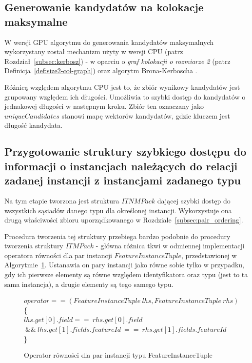 \documentclass[12pt]{article}
\begin{document}
\subsection{Generowanie kandydatów na kolokacje maksymalne}

W wersji GPU algorytmu do generowania kandydatów maksymalnych wykorzystany został mechanizm użyty w wersji CPU (patrz Rozdział~\ref{subsec:kerbosz}) -  w oparciu o \textit{graf kolokacji o rozmiarze 2} (patrz Definicja~\ref{def:size2-col-graph}) oraz algorytm Brona-Kerboscha \cite{kerbosz}.

Różnicą względem algorytmu CPU jest to, że zbiór wynikowy kandydatów jest grupowany względem ich długości. Umożliwia to szybki dostęp do kandydatów o jednakowej długości w następnym kroku. Zbiór ten oznaczany jako $ uniqueCandidates $ stanowi mapę wektorów kandydatów, gdzie kluczem jest długość kandydata.

\subsection{Przygotowanie struktury szybkiego dostępu do informacji o instancjach należących do relacji zadanej instancji z instancjami zadanego typu}

Na tym etapie tworzona jest struktura $ ITNMPack $ dającej szybki dostęp do wszystkich sąsiadów danego typu dla określonej instancji. Wykorzystuje ona drugą właściwości zbioru uporządkowanego w Rozdziale~\ref{subsec:pair_ordering}.

Procedura tworzenia tej struktury przebiega bardzo podobnie do procedury tworzenia struktury $ ITMPack $ - główna różnica tkwi w odmiennej implementacji operatora równości dla par instancji $ FeatureInstanceTuple $, przedstawionej w Algorytmie~\ref{alg:FeatureInstanceTuple_operatorITNMPack}. Ustanawia on pary instancji jako równe sobie tylko w przypadku, gdy ich pierwsze elementy są równe względem identyfikatora oraz typu (jest to ta sama instancja), a drugie elementy są tego samego typu.

\begin{figure}[H]
\begin{algorithm}[H]
$operator==(FeatureInstanceTuple\ lhs,FeatureInstanceTuple\ rhs) $\\
\{\\
\Return $lhs.get[0].field ==\ rhs.get[0].field$\\
$\ \&\&\ lhs.get[1].fields.featureId\ ==\ rhs.get[1].fields.featureId$\\
\}
\caption{Operator równości dla par instancji typu FeatureInstanceTuple }
\label{alg:FeatureInstanceTuple_operatorITNMPack}
\end{algorithm}
\end{figure}
\end{document}
